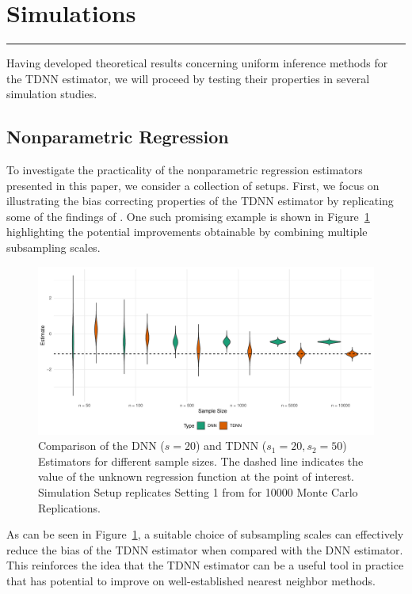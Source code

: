 \section{Simulations}\label{sec:simulations}
\hrule

Having developed theoretical results concerning uniform inference methods for the TDNN estimator, we will proceed by testing their properties in several simulation studies.

\subsection{Nonparametric Regression}
To investigate the practicality of the nonparametric regression estimators presented in this paper, we consider a collection of setups.
First, we focus on illustrating the bias correcting properties of the TDNN estimator by replicating some of the findings of \citet{demirkaya_optimal_2024}.
One such promising example is shown in Figure~\ref{fig:TDNN_bias_cor} highlighting the potential improvements obtainable by combining multiple subsampling scales.
\begin{figure}[H]
	\centering
	\includegraphics[width = \textwidth]{../Code/Simulations/Graphics/TDNN_DNN.pdf}
	\caption{Comparison of the DNN ($s = 20$) and TDNN ($s_1 = 20, s_2 = 50$) Estimators for different sample sizes.
		The dashed line indicates the value of the unknown regression function at the point of interest.
		Simulation Setup replicates Setting 1 from \citet{demirkaya_optimal_2024} for 10000 Monte Carlo Replications.}
	\label{fig:TDNN_bias_cor}
\end{figure}
As can be seen in Figure~\ref{fig:TDNN_bias_cor}, a suitable choice of subsampling scales can effectively reduce the bias of the TDNN estimator when compared with the DNN estimator.
This reinforces the idea that the TDNN estimator can be a useful tool in practice that has potential to improve on well-established nearest neighbor methods.

